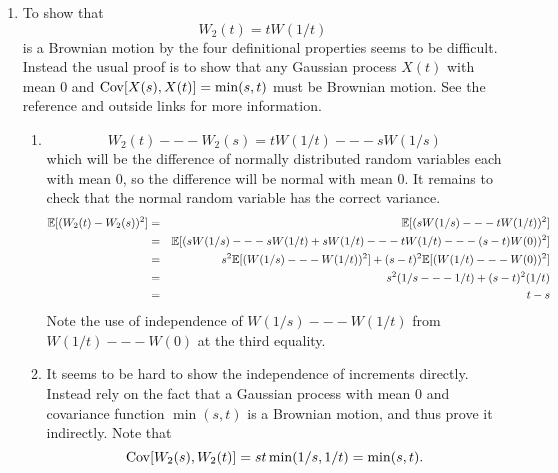 \begin{solution}
\begin{solution}
\begin{solution}
\begin{solution}
\begin{solution}
\begin{solution}
\begin{solution}
\begin{solution}
\begin{solution}
\begin{solution}
\begin{enumerate}
\begin{enumerate}
       \item
       Note that if $ t_1 < t_2 \le t_3 < t_4 $, then $ t_1/c^2
       < t_2/c^2 \le t_3/c^2 < t_4/c^2 $, and the corresponding
       increments $ W(t_4/c^2) - W(t_3/c^2) $ and $ W(t_2/c^2)
       - W(t_1/c^2) $ are independent.  Then the multiples of
       each by $ c $ are independent and so $ W_1(t_4) --- W_1(t_3)
       $ and $ W_1(t_2) - W_1(t_1) $ are independent.

       \item
       $ W_1(0) = c W(0/c^2) = c W(0) = 0 $.
       
       \item
       As the composition of continuous functions, $ W_1 $ is
       continuous.
    \end{enumerate}

  \item
  To show that 
  \[
    W_2(t) = t W(1/t)
  \]
  is a Brownian motion by the four definitional properties
  seems to be difficult.  Instead the usual proof is to show
  that any Gaussian process $X(t)$ with mean $0$ and $\operatorname{Cov}[X(s),
  X(t)] = \min(s,t)$ must be Brownian motion. See the reference
  and outside links for more information.
  \begin{enumerate}
    \item
    \[
      W_2(t) --- W_2(s) = t W(1/t) --- s W(1/s)
    \]
    which will be the difference of normally distributed
    random variables each with mean $ 0 $, so the difference
    will be normal with mean $ 0 $.  It remains to check
    that the normal random variable has the correct
    variance.
    \begin{eqnarray*}
      \mathbb{E}[ (W_2(t)-W_2(s))^2] &=& \mathbb{E}[ (s W(1/s) --- t W(1/
      t))^2 ] \\
      &=& \mathbb{E}[ ( s W(1/s) --- s W(1/t) + s W(1/t) --- t W(1/t)
       --- (s -t) W(0) )^2 ] \\
      &=& s^2 \mathbb{E}[ (W(1/s) --- W(1/t))^2 ] + (s-t)^2 \mathbb{E}[
      (W(1/t) --- W(0))^2
      ] \\
      &=& s^2 ( 1/s --- 1/t ) + (s-t)^2 ( 1/t ) \\
      &=& t-s
    \end{eqnarray*}
    Note the use of independence of $ W(1/s) --- W(1/t) $
    from $ W(1/t) --- W(0) $ at the third equality.

    \item
    It seems to be hard to show the independence of
    increments directly.  Instead rely on the fact that a
    Gaussian process with mean $0$ and covariance function
    $\min(s,t)$ is a Brownian motion, and thus prove it indirectly.
    Note that
    \[
      \operatorname{Cov}[ W_2(s), W_2(t)] = st \min(1/s, 1/t) =
      \min(s,t).
    \]


\end{enumerate}
\end{enumerate}
\end{solution}
\end{solution}
\end{solution}
\end{solution}
\end{solution}
\end{solution}
\end{solution}
\end{solution}
\end{solution}
\end{solution}
